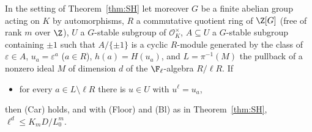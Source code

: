 In the setting of Theorem~\ref{thm:SH} let moreover $G$ be a finite abelian group acting on $K$ by automorphisms, $R$ a commutative quotient ring of $\Z[G]$ (free of rank $m$ over $\Z$), $U$ a $G$-stable subgroup of $\mathcal O_K^\times$, $A\subseteq U$ a $G$-stable subgroup containing $\pm1$ such that $A/\{\pm1\}$ is a cyclic $R$-module generated by the class of $\varepsilon\in A$, $u_a=\varepsilon^{a}$ ($a\in R$), $h(a)=H(u_a)$, and $L=\pi^{-1}(M)$ the pullback of a nonzero ideal $M$ of dimension $d$ of the $\F_\ell$-algebra $R/\ell R$. If
\begin{itemize}
\item[(Sat)] for every $a\in L\setminus\ell R$ there is $u\in U$ with $u^{\ell}=u_a$,
\end{itemize}
then (Car) holds, and with (Floor) and (Bl) as in Theorem~\ref{thm:SH}, $\ell^{d}\le K_mD/L_0^{m}$.
